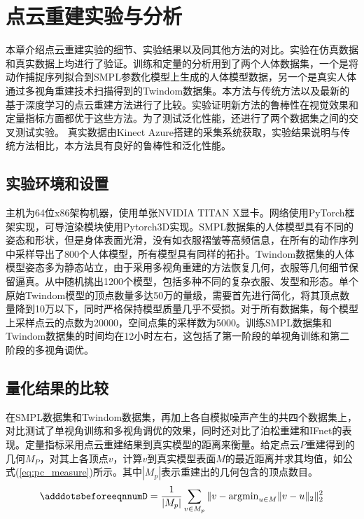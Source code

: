 \chapter{点云重建实验与分析}
本章介绍点云重建实验的细节、实验结果以及同其他方法的对比。实验在仿真数据和真实数据上均进行了验证。训练和定量的分析用到了两个人体数据集，一个是将动作捕捉序列拟合到SMPL参数化模型\citep{loper2015smpl}上生成的人体模型数据，另一个是真实人体通过多视角重建技术扫描得到的Twindom数据集。本方法与传统方法\citep{kazhdan2006, kazhdan2013}以及最新的基于深度学习的点云重建方法\citep{Chibane_2020_CVPR}进行了比较。实验证明新方法的鲁棒性在视觉效果和定量指标方面都优于这些方法。为了测试泛化性能，还进行了两个数据集之间的交叉测试实验。
真实数据由Kinect Azure搭建的采集系统获取，实验结果说明与传统方法相比，本方法具有良好的鲁棒性和泛化性能。

\section{实验环境和设置}
主机为64位x86架构机器，使用单张NVIDIA TITAN X显卡。网络使用PyTorch框架实现，可导渲染模块使用Pytorch3D实现。SMPL数据集的人体模型具有不同的姿态和形状，但是身体表面光滑，没有如衣服褶皱等高频信息，在所有的动作序列中采样导出了800个人体模型，所有模型具有同样的拓扑。Twindom数据集的人体模型姿态多为静态站立，由于采用多视角重建的方法恢复几何，衣服等几何细节保留逼真。从中随机挑出1200个模型，包括多种不同的复杂衣服、发型和形态。单个原始Twindom模型的顶点数量多达50万的量级，需要首先进行简化，将其顶点数量降到10万以下，同时严格保持模型质量几乎不受损。对于所有数据集，每个模型上采样点云的点数为20000，空间点集的采样数为5000。训练SMPL数据集和Twindom数据集的时间均在12小时左右，这包括了第一阶段的单视角训练和第二阶段的多视角调优。

\section{量化结果的比较}
在SMPL数据集和Twindom数据集，再加上各自模拟噪声产生的共四个数据集上，对比测试了单视角训练和多视角调优的效果，同时还对比了泊松重建和IFnet的表现。定量指标采用点云重建结果到真实模型的距离来衡量。给定点云$P$重建得到的几何$M_P$，对其上各顶点$v$，计算$v$到真实模型表面$M$的最近距离并求其均值，如公式(\ref{eq:pc_measure})所示。其中$|M_p|$表示重建出的几何包含的顶点数目。
\begin{equation} \label{eq:pc_measure}
    \adddotsbeforeeqnnum%
    D = \frac{1}{|M_p|}\sum_{v \in M_p} \|v - \mathrm{argmin}_{u\in M}\|v - u\|_2\|_2^2
\end{equation}

